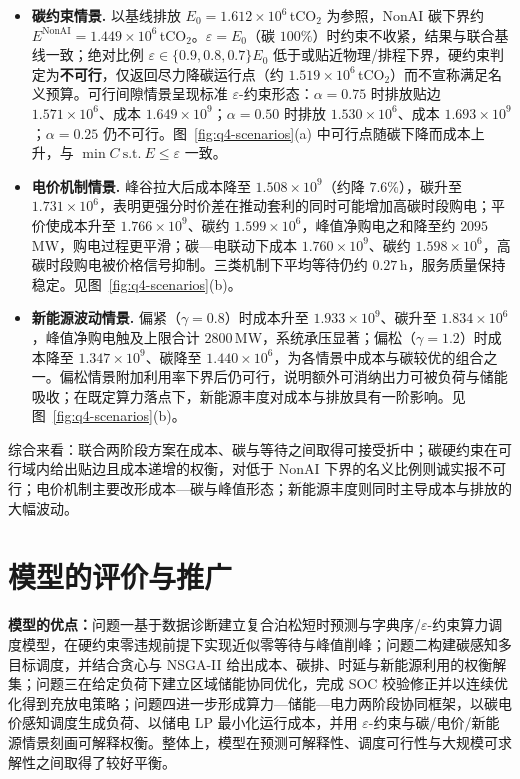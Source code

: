 \documentclass[UTF8,a4paper,zihao=-4]{ctexart}
\begin{document}
\begin{itemize}
  \item \textbf{碳约束情景.}
  以基线排放 \(E_0=1.612\times 10^6\)\,tCO\(_2\) 为参照，NonAI 碳下界约 \(E^{\mathrm{NonAI}}=1.449\times 10^6\)\,tCO\(_2\)。\(\varepsilon=E_0\)（碳 \(100\%\)）时约束不收紧，结果与联合基线一致；绝对比例 \(\varepsilon\in\{0.9,0.8,0.7\}E_0\) 低于或贴近物理/排程下界，硬约束判定为\textbf{不可行}，仅返回尽力降碳运行点（约 \(1.519\times 10^6\)\,tCO\(_2\)）而不宣称满足名义预算。可行间隙情景呈现标准 \(\varepsilon\)-约束形态：\(\alpha=0.75\) 时排放贴边 \(1.571\times 10^6\)、成本 \(1.649\times 10^9\)；\(\alpha=0.50\) 时排放 \(1.530\times 10^6\)、成本 \(1.693\times 10^9\)；\(\alpha=0.25\) 仍不可行。图~\ref{fig:q4-scenarios}(a) 中可行点随碳下降而成本上升，与 \(\min C\ \mathrm{s.t.}\ E\le\varepsilon\) 一致。

  \item \textbf{电价机制情景.}
  峰谷拉大后成本降至 \(1.508\times 10^9\)（约降 \(7.6\%\)），碳升至 \(1.731\times 10^6\)，表明更强分时价差在推动套利的同时可能增加高碳时段购电；平价使成本升至 \(1.766\times 10^9\)、碳约 \(1.599\times 10^6\)，峰值净购电之和降至约 \(2095\)\,MW，购电过程更平滑；碳—电联动下成本 \(1.760\times 10^9\)、碳约 \(1.598\times 10^6\)，高碳时段购电被价格信号抑制。三类机制下平均等待仍约 \(0.27\)\,h，服务质量保持稳定。见图~\ref{fig:q4-scenarios}(b)。

  \item \textbf{新能源波动情景.}
  偏紧（\(\gamma=0.8\)）时成本升至 \(1.933\times 10^9\)、碳升至 \(1.834\times 10^6\)，峰值净购电触及上限合计 \(2800\)\,MW，系统承压显著；偏松（\(\gamma=1.2\)）时成本降至 \(1.347\times 10^9\)、碳降至 \(1.440\times 10^6\)，为各情景中成本与碳较优的组合之一。偏松情景附加利用率下界后仍可行，说明额外可消纳出力可被负荷与储能吸收；在既定算力落点下，新能源丰度对成本与排放具有一阶影响。见图~\ref{fig:q4-scenarios}(b)。
\end{itemize}

综合来看：联合两阶段方案在成本、碳与等待之间取得可接受折中；碳硬约束在可行域内给出贴边且成本递增的权衡，对低于 NonAI 下界的名义比例则诚实报不可行；电价机制主要改形成本—碳与峰值形态；新能源丰度则同时主导成本与排放的大幅波动。

\section{模型的评价与推广}

\textbf{模型的优点：}问题一基于数据诊断建立复合泊松短时预测与字典序/$\varepsilon$-约束算力调度模型，在硬约束零违规前提下实现近似零等待与峰值削峰；问题二构建碳感知多目标调度，并结合贪心与 NSGA-II 给出成本、碳排、时延与新能源利用的权衡解集；问题三在给定负荷下建立区域储能协同优化，完成 SOC 校验修正并以连续优化得到充放电策略；问题四进一步形成算力—储能—电力两阶段协同框架，以碳电价感知调度生成负荷、以储电 LP 最小化运行成本，并用 $\varepsilon$-约束与碳/电价/新能源情景刻画可解释权衡。整体上，模型在预测可解释性、调度可行性与大规模可求解性之间取得了较好平衡。
\end{document}
